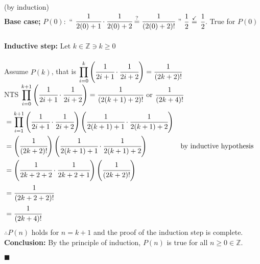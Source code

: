 \documentclass[12pt]{article}
\newcommand{\Z}{\mathbb{Z}}
\renewcommand{\qed}{\hfill$\blacksquare$}
\renewenvironment{proof}{\begin{addmargin}[1em]{0em}\begin{newproof}}{\end{newproof}\end{addmargin}\qed}
\begin{document}
\begin{proof}(by induction) \\
	\textbf{Base case;} $P(0):$ `` $\cfrac{1}{2(0)+1} \cdot \cfrac{1}{2(0)+2} \overset{?}{=} \cfrac{1}{(2(0)+2)!}$ '' $\cfrac{1}{2} \, \overset{\checkmark}{=} \, \cfrac{1}{2} $. True for $P(0)$ \\ \\
	\textbf{Inductive step:} Let $k \in \Z \ni k \ge 0$ \\ \\
	Assume $P(k)$, that is $\displaystyle \prod_{i=0}^k \left( \cfrac{1}{2i+1} \cdot \cfrac{1}{2i+2} \right) = \cfrac{1}{(2k+2)!}$ \\
	\lbrack NTS $\displaystyle \prod_{i=0}^{k+1} \left( \cfrac{1}{2i+1} \cdot \cfrac{1}{2i+2} \right) = \cfrac{1}{(2(k+1)+2)!}$ or $\cfrac{1}{(2k+4)!}$\rbrack
	\begin{align*}
		 & = \displaystyle \prod_{i=1}^{k+1} \left( \cfrac{1}{2i+1} \cdot \cfrac{1}{2i+2} \right) \left( \cfrac{1}{2(k+1)+1} \cdot \cfrac{1}{2(k+1)+2} \right)                                     \\
		 & = \left ( \cfrac{1}{(2k+2)!} \right ) \left( \cfrac{1}{2(k+1)+1} \cdot \cfrac{1}{2(k+1)+2} \right)                                                  &  & \text{by inductive hypothesis} \\
		 & = \left( \cfrac{1}{2k+2+2} \cdot \cfrac{1}{2k+2+1} \right ) \left ( \cfrac{1}{(2k+2)!} \right )                                                                                         \\
		 & = \cfrac{1}{(2k+2+2)!}                                                                                                                                                                  \\
		 & =\cfrac{1}{(2k+4)!}
	\end{align*}
	$\therefore P(n)$ holds for $n = k + 1$ and the proof of the induction step is complete. \\
	\textbf{Conclusion:} By the principle of induction, $P(n)$ is true for all $n\ge0 \in \Z$.
\end{proof}
\end{document}
